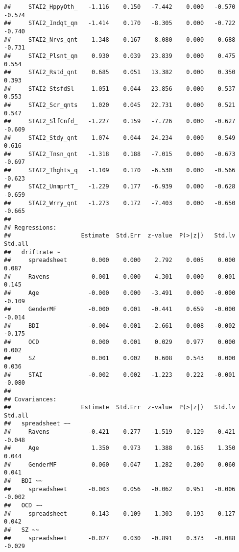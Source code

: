 \documentclass[]{article}
\begin{document}
\begin{verbatim}
##     STAI2_HppyOth_   -1.116    0.150   -7.442    0.000   -0.570   -0.574
##     STAI2_Indqt_qn   -1.414    0.170   -8.305    0.000   -0.722   -0.740
##     STAI2_Nrvs_qnt   -1.348    0.167   -8.080    0.000   -0.688   -0.731
##     STAI2_Plsnt_qn    0.930    0.039   23.839    0.000    0.475    0.554
##     STAI2_Rstd_qnt    0.685    0.051   13.382    0.000    0.350    0.393
##     STAI2_StsfdSl_    1.051    0.044   23.856    0.000    0.537    0.553
##     STAI2_Scr_qnts    1.020    0.045   22.731    0.000    0.521    0.547
##     STAI2_SlfCnfd_   -1.227    0.159   -7.726    0.000   -0.627   -0.609
##     STAI2_Stdy_qnt    1.074    0.044   24.234    0.000    0.549    0.616
##     STAI2_Tnsn_qnt   -1.318    0.188   -7.015    0.000   -0.673   -0.697
##     STAI2_Thghts_q   -1.109    0.170   -6.530    0.000   -0.566   -0.623
##     STAI2_UnmprtT_   -1.229    0.177   -6.939    0.000   -0.628   -0.659
##     STAI2_Wrry_qnt   -1.273    0.172   -7.403    0.000   -0.650   -0.665
## 
## Regressions:
##                    Estimate  Std.Err  z-value  P(>|z|)   Std.lv  Std.all
##   driftrate ~                                                           
##     spreadsheet       0.000    0.000    2.792    0.005    0.000    0.087
##     Ravens            0.001    0.000    4.301    0.000    0.001    0.145
##     Age              -0.000    0.000   -3.491    0.000   -0.000   -0.109
##     GenderMF         -0.000    0.001   -0.441    0.659   -0.000   -0.014
##     BDI              -0.004    0.001   -2.661    0.008   -0.002   -0.175
##     OCD               0.000    0.001    0.029    0.977    0.000    0.002
##     SZ                0.001    0.002    0.608    0.543    0.000    0.036
##     STAI             -0.002    0.002   -1.223    0.222   -0.001   -0.080
## 
## Covariances:
##                    Estimate  Std.Err  z-value  P(>|z|)   Std.lv  Std.all
##   spreadsheet ~~                                                        
##     Ravens           -0.421    0.277   -1.519    0.129   -0.421   -0.048
##     Age               1.350    0.973    1.388    0.165    1.350    0.044
##     GenderMF          0.060    0.047    1.282    0.200    0.060    0.041
##   BDI ~~                                                                
##     spreadsheet      -0.003    0.056   -0.062    0.951   -0.006   -0.002
##   OCD ~~                                                                
##     spreadsheet       0.143    0.109    1.303    0.193    0.127    0.042
##   SZ ~~                                                                 
##     spreadsheet      -0.027    0.030   -0.891    0.373   -0.088   -0.029

\end{verbatim}
\end{document}
